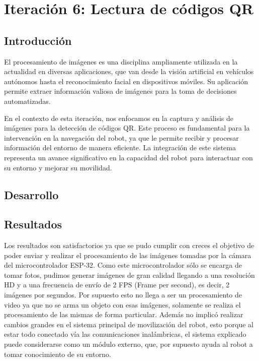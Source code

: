 \newpage
\section{Iteración 6: Lectura de códigos QR}

\subsection{Introducción}

El procesamiento de imágenes es una disciplina ampliamente utilizada en la actualidad en diversas aplicaciones, que van desde la visión artificial en vehículos autónomos hasta el reconocimiento facial en dispositivos móviles. Su aplicación permite extraer información valiosa de imágenes para la toma de decisiones automatizadas.

En el contexto de esta iteración, nos enfocamos en la captura y análisis de imágenes para la detección de códigos QR. Este proceso es fundamental para la intervención en la navegación del robot, ya que le permite recibir y procesar información del entorno de manera eficiente. La integración de este sistema representa un avance significativo en la capacidad del robot para interactuar con su entorno y mejorar su movilidad.



\subsection{Desarrollo}







\subsection{Resultados}
Los resultados son satisfactorios ya que se pudo cumplir con creces el objetivo de poder enviar y realizar el procesamiento de las imágenes tomadas por la cámara del microcontrolador ESP-32. Como este microcontrolador sólo se encarga de tomar fotos, pudimos generar imágenes de gran calidad llegando a una resolución HD y a una frecuencia de envío de 2 FPS (Frame per second), es decir, 2 imágenes por segundos. Por supuesto esto no llega a ser un procesamiento de video ya que no se arma un objeto con esas imágenes, solamente se realiza el procesamiento de las mismas de forma particular.
Además no implicó realizar cambios grandes en el sistema principal de movilización del robot, esto porque al estar todo conectado vía las comunicaciones inalámbricas, el sistema explicado puede considerarse como un módulo externo, que, por supuesto ayuda al robot a tomar conocimiento de su entorno.

